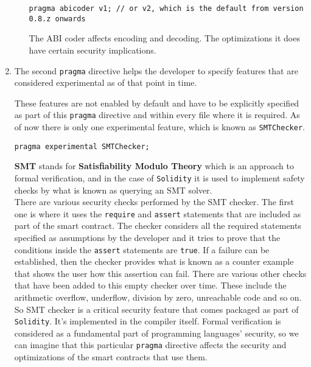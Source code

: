 \begin{enumerate}
\begin{enumerate}[label*=\arabic*.]
      \begin{lstlisting}[language=Solidity, style=solStyle, caption={Example of ABI coder \texttt{pragma} statement.}]
pragma abicoder v1; // or v2, which is the default from version 0.8.z onwards
      \end{lstlisting}

      The ABI coder affects encoding and decoding.
      The optimizations it does have certain security implications.
   
   \end{enumerate}
   
   \item The second \texttt{pragma} directive helps the developer to specify features that are considered experimental as of that point in time.\\

   \pagebreak

   These features are not enabled by default and have to be explicitly specified as part of this \texttt{pragma} directive and within every file where it is required.
   As of now there is only one experimental feature, which is known as \texttt{SMTChecker}.

   \begin{lstlisting}[language=Solidity, style=solStyle, caption={Example of experimental \texttt{pragma} statement.}]
pragma experimental SMTChecker;
   \end{lstlisting}

   \textbf{SMT} stands for \textbf{Satisfiability Modulo Theory} which is an approach to formal verification, and in the case of \texttt{Solidity} it is used to implement safety checks by what is known as querying an SMT solver.\\

   There are various security checks performed by the SMT checker.
   The first one is where it uses the \texttt{require} and \texttt{assert} statements that are included as part of the smart contract.
   The checker considers all the required statements specified as assumptions by the developer and it tries to prove that the conditions inside the \texttt{assert} statements are \texttt{true}.
   If a failure can be established, then the checker provides what is known as a counter example that shows the user how this assertion can fail.
   There are various other checks that have been added to this empty checker over time.
   These include the arithmetic overflow, underflow, division by zero, unreachable code and so on.\\

   So SMT checker is a critical security feature that comes packaged as part of \texttt{Solidity}.
   It's implemented in the compiler itself.
   Formal verification is considered as a fundamental part of programming languages' security, so we can imagine that this particular \texttt{pragma} directive affects the security and optimizations of the smart contracts that use them.

\end{enumerate}

